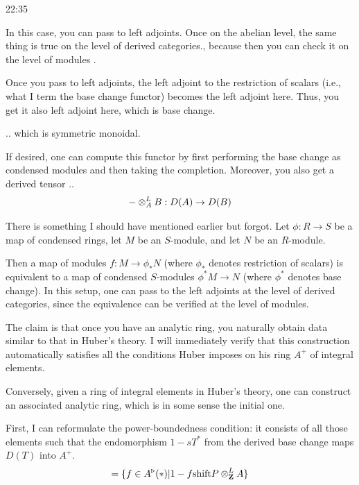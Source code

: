 \begin{unfinished}{22:35}
\ed

In this case, you can pass to left adjoints. 
Once on the abelian level, the same thing is true on the level of derived categories., because then you can check it on the level of modules .

Once you pass to left adjoints, the left adjoint to the restriction of scalars (i.e., what I term the base change functor) becomes the left adjoint here. 
Thus, you get it also left adjoint here, which is base change.

.. which is symmetric monoidal.

If desired, one can compute this functor by first performing the base change as condensed modules and then taking the completion. Moreover, you also get a derived tensor .. 
\begin{align*}
- \otimes_A^L B: D(A) \to D(B)
\end{align*}

There is something I should have mentioned earlier but forgot. Let $\phi\colon R \to S$ be a map of condensed rings, let $M$ be an $S$-module, and let $N$ be an $R$-module.

Then a map of modules $f\colon M \to \phi_* N$ (where $\phi_*$ denotes restriction of scalars) is equivalent to a map of condensed $S$-modules $\phi^* M \to N$ (where $\phi^*$ denotes base change). 
In this setup, one can pass to the left adjoints at the level of derived categories,  since the equivalence can be verified at the level of modules.



The claim is that once you have an analytic ring, you naturally obtain data similar to that in Huber's theory.
I will immediately verify that this construction automatically satisfies all the conditions Huber imposes on his ring $A^+$ of integral elements.

Conversely, given a ring of integral elements in Huber's theory, one can construct an associated analytic ring, which is in some sense the initial one.

First, I can reformulate the power-boundedness condition: it consists of all those elements such that the endomorphism $1 - sT^*$ from the derived base change maps $D(T)$ into $A^+$.
\begin{align*}
 = \{ f \in A^\triangleright(\ast) | 1 - f \text{shift}  P \otimes^L_\mathbf Z A \}
\end{align*}


\end{unfinished}
